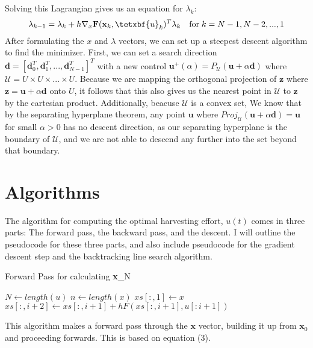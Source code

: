 \documentclass{article}
\begin{document}
Solving this Lagrangian gives us an equation for $\lambda_{k}$:
\begin{equation}
    \lambda_{k-1}=\lambda_{k}+h\nabla_{x}\textbf{F}(\textbf{x}_{k},\tetxbf{u}_{k})^T \lambda_{k} \quad \text{for} \; k = N-1,N-2,...,1
\end{equation}
After formulating the $x$ and $\lambda$ vectors, we can set up a steepest descent algorithm to find the minimizer. First, we can set a search direction $\textbf{d} = [\textbf{d}_{0}^T, \textbf{d}_{1}^T, ..., \textbf{d}_{N-1}^T]^T$ with a new control $\textbf{u}^+(\alpha)=P_{\mathcal{U}}(\textbf{u} + \alpha \textbf{d})$ where $\mathcal{U} = U \times U \times ... \times U$. Because we are mapping the orthogonal projection of $\textbf{z}$ where $\textbf{z} = \textbf{u} + \alpha \textbf{d}$ onto $U$, it follows that this also gives us the nearest point in $\mathcal{U}$ to $\textbf{z}$ by the cartesian product.
Additionally, beacuse $\mathcal{U}$ is a convex set, We know that by the separating hyperplane theorem, any point $\textbf{u}$ where $Proj_{\mathcal{U}}(\textbf{u} + \alpha \textbf{d}) = \textbf{u}$ for small $\alpha > 0$ has no descent direction, as our separating hyperplane is the boundary of $\mathcal{U}$, and we are not able to descend any further into the set beyond that boundary.

\section{Algorithms}
The algorithm for computing the optimal harvesting effort, $u(t)$ comes in three parts: The forward pass, the backward pass, and the descent. I will outline the pseudocode for these three parts, and also include pseudocode for the gradient descent step and the backtracking line search algorithm.

\begin{algorithm}
\caption{Forward Pass for calculating \textbf{x}_N}\label{alg:cap}
\begin{algorithmic}
\State $N \gets length(u)$
\State $n \gets length(x)$
\State $xs[:,1] \gets x$
\
    \State $xs[:, i+2] \gets xs[:, i+1] + hF(xs[:,i+1],u[:i+1])$
\EndFor
\end{algorithmic}
\end{algorithm}
This algorithm makes a forward pass through the $\textbf{x}$ vector, building it up from $\textbf{x}_{0}$ and proceeding forwards. This is based on equation (3).
\newpage
\end{document}
